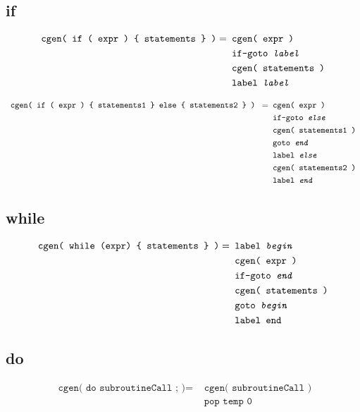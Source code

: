 \documentclass[a4paper]{book}
\begin{document}
\subsection*{if}
\begin{align*}
    \texttt{ cgen( if ( expr ) \{ statements \} )} = & \texttt{ cgen( expr )} \\
    & \texttt{ if-goto \textit{label} } \\
    & \texttt{ cgen( statements ) } \\
    & \texttt{ label \textit{label} }
\end{align*}

\begin{align*}
    \texttt{ cgen( if ( expr ) \{ statements1 \} else \{ statements2 \} ) } = & \texttt{ cgen( expr ) } \\
    & \texttt{ if-goto \textit{else}} \\
    & \texttt{ cgen( statements1 )} \\
    & \texttt{ goto \textit{end} } \\
    & \texttt{ label \textit{else} } \\
    & \texttt{ cgen( statements2 ) } \\
    & \texttt{ label \textit{end} }
\end{align*}


\subsection*{while}
\begin{align*}
    \texttt{ cgen( while (expr) \{ statements \} )} = & \texttt{ label \textit{begin} } \\
    & \texttt{ cgen( expr )} \\
    & \texttt{ if-goto \textit{end} } \\
    & \texttt{ cgen( statements ) } \\
    & \texttt{ goto \textit{begin} } \\
    & \texttt{ label \texttt{end} }
\end{align*}


\subsection*{do}
\begin{align*}
    \texttt{ cgen( do subroutineCall ; )} = & \texttt{ cgen( subroutineCall )} \\
    & \texttt{ pop temp 0 }
\end{align*}
\end{document}
